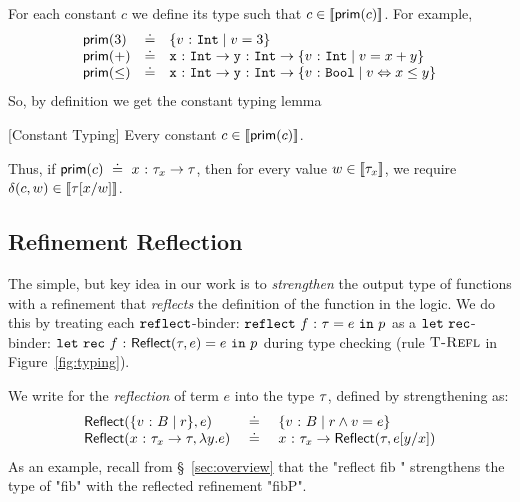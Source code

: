 For each constant $c$ we define its type 
such that $c \in [\![\mathsf{prim}(c)]\!]$.
%
For example,
%
$$
\begin{array}{lcl}
\mathsf{prim}(3) &\doteq& \{ {v} \ \text{:}\ {\texttt{{Int}}} \mid v = 3 \}\\
\mathsf{prim}(+) &\doteq& {\mathtt{x}} \ \text{:}\ {\texttt{{Int}}} \rightarrow {\mathtt{y}} \ \text{:}\ {\texttt{{Int}}} \rightarrow \{ {v} \ \text{:}\ {\texttt{{Int}}} \mid v = x + y \}\\
\mathsf{prim}(\leq) &\doteq& {\mathtt{x}} \ \text{:}\ {\texttt{{Int}}} \rightarrow {\mathtt{y}} \ \text{:}\ {\texttt{{Int}}} \rightarrow \{ {v} \ \text{:}\ {\texttt{Bool}} \mid v \Leftrightarrow x \leq y \}\\
\end{array}
$$
%
So, by definition we get the constant typing lemma
%
\begin{lemma}{[Constant Typing]}\label{lemma:constants}
Every constant $c \in [\![\mathsf{prim}(c)]\!]$.
\end{lemma}
%
Thus, if $\mathsf{prim}(c) \ \doteq\  {x} \ \text{:}\ {\tau_x} \rightarrow \tau$,
then for every value $w \in [\![\tau_x]\!]$, we require
$\delta(c, w) \in [\![\tau[{x}/{w}]]\!]$.


\subsection{Refinement Reflection}
\label{subsec:appendix:logicalannotations}
%
The simple, but key idea in our work is to
\emph{strengthen} the output type of functions
with a refinement that \emph{reflects} the
definition of the function in the logic.
%
We do this by treating each
%
$\mathtt{reflect}$-binder:
%
${{\mathtt{reflect}}\ {f} \ \text{:}\ {\tau} = e\ \mathtt{in}\ {p}}$
%
as a $\mathtt{let\ rec}$-binder:
%
${{\mathtt{let\ rec}}\ {f} \ \text{:}\ {\mathsf{Reflect}(\tau, e)} = e\ \mathtt{in}\ {p}}$
%
during type checking (rule $\textsc{T-Refl}$ in Figure~\ref{fig:typing}).

%
We write  for the \emph{reflection}
of term $e$ into the type $\tau$,  defined by strengthening
\typ as:
%
$$
\begin{array}{lcl}
\mathsf{Reflect}(\{ {v} \ \text{:}\ {B} \mid r \}, e)
  & \ \doteq\ 
  & \{ {v} \ \text{:}\ {B} \mid r \land v = e \}\\
\mathsf{Reflect}({x} \ \text{:}\ {\tau_x} \rightarrow \tau, \lambda y. e)
  & \ \doteq\ 
  & {x} \ \text{:}\ {\tau_x} \rightarrow \mathsf{Reflect}(\tau, e[{y}/{x}])
\end{array}
$$
%
As an example, recall from \S~\ref{sec:overview}
that the "reflect fib " strengthens the type of
"fib" with the reflected refinement "fibP".


